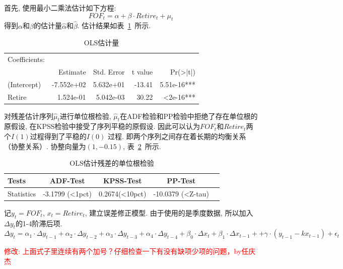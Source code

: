 首先, 使用最小二乘法估计如下方程:
$$FOF_t = \alpha + \beta \cdot Retire_t + \mu_t$$
得到$\alpha$和$\beta$的估计量$\hat{\alpha}$和$\hat{\beta}$. 估计结果如表~\ref{tab:coin-OLS-estimate}~所示.

\begin{table}[ht]
    \centering
    \caption{OLS估计量}
    \label{tab:coin-OLS-estimate}
    \begin{tabular}{l | rrrr}
        Coefficients: &            &            &         &                     \\
                      & Estimate   & Std. Error & t value & Pr(\textgreater|t|) \\  \hline
        (Intercept)   & -7.552e+02 & 5.632e+01  & -13.41  & 5.51e-16***        \\
        Retire        & 1.524e-01  & 5.042e-03  & 30.22   & \textless 2e-16***
    \end{tabular}
\end{table}


对残差估计序列$\hat{\mu}_t$进行单位根检验, $\hat{\mu}_t$在ADF检验和PP检验中拒绝了存在单位根的原假设, 在KPSS检验中接受了序列平稳的原假设.
因此可以认为${FOF_t}$和${Retire_t}$两个$I(1)$过程得到了平稳的$I(0)$
过程. 即两个序列之间存在着长期的均衡关系（协整关系）. 协整向量为$(1, -0.15)$, 表~\ref{tab:coin-OLS-resid-uniroot}~所示.

\begin{table}[ht]
    \centering
    \caption{OLS估计残差的单位根检验}
    \label{tab:coin-OLS-resid-uniroot}
    \begin{tabular}{l | cccc}
        Tests        & ADF-Test       & KPSS-Test      & PP-Test               \\  \hline
        Statistics   & -3.1799 (<1pct) & 0.2674(<10pct) & -10.0379 (<Z-tau)
    \end{tabular}
\end{table}

记$y_t = FOF_t$, $x_t = Retire_t$, 建立误差修正模型. 由于使用的是季度数据, 所以加入$\Delta y_t$的1-4阶滞后项.
$$\Delta y_t = \alpha_1 \cdot \Delta y_{t-1} + \alpha_2  \cdot \Delta  y_{t-2} + \alpha_3 \cdot \Delta  y_{t-3} + \alpha_4 \cdot \Delta  y_{t-4} + \beta_0 \cdot \Delta  x_t+\beta_1 \cdot \Delta  x_{t-1} + +\gamma \cdot ( y_{t-1}-kx_{t-1}) + \epsilon_t$$

\textcolor{red}{修改: 上面式子里连续有两个加号？仔细检查一下有没有缺项少项的问题，by任庆杰}

